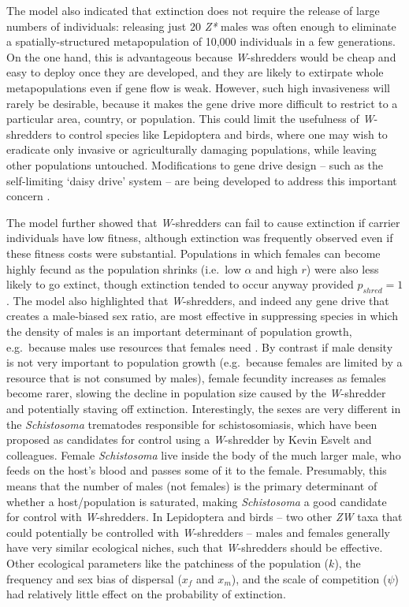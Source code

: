 \documentclass[]{rsos}%
\begin{document}
The model also indicated that extinction does not require the release of
large numbers of individuals: releasing just 20 \emph{Z*} males was
often enough to eliminate a spatially-structured metapopulation of
10,000 individuals in a few generations. On the one hand, this is
advantageous because \emph{W}-shredders would be cheap and easy to
deploy once they are developed, and they are likely to extirpate whole
metapopulations even if gene flow is weak. However, such high
invasiveness will rarely be desirable, because it makes the gene drive
more difficult to restrict to a particular area, country, or population.
This could limit the usefulness of \emph{W}-shredders to control species
like Lepidoptera and birds, where one may wish to eradicate only
invasive or agriculturally damaging populations, while leaving other
populations untouched. Modifications to gene drive design -- such as the
self-limiting `daisy drive' system -- are being developed to address
this important concern \citep{min2017da, noble2019da}.

The model further showed that \emph{W}-shredders can fail to cause
extinction if carrier individuals have low fitness, although extinction
was frequently observed even if these fitness costs were substantial.
Populations in which females can become highly fecund as the population
shrinks (i.e.~low \(\alpha\) and high \(r\)) were also less likely to go
extinct, though extinction tended to occur anyway provided
\(p_{shred} = 1\). The model also highlighted that \emph{W}-shredders,
and indeed any gene drive that creates a male-biased sex ratio, are most
effective in suppressing species in which the density of males is an
important determinant of population growth, e.g.~because males use
resources that females need \citep{li2019int}. By contrast if male
density is not very important to population growth (e.g.~because females
are limited by a resource that is not consumed by males), female
fecundity increases as females become rarer, slowing the decline in
population size caused by the \emph{W}-shredder and potentially staving
off extinction. Interestingly, the sexes are very different in the
\emph{Schistosoma} trematodes responsible for schistosomiasis, which
have been proposed as candidates for control using a \emph{W}-shredder
by Kevin Esvelt and colleagues. Female \emph{Schistosoma} live inside
the body of the much larger male, who feeds on the host's blood and
passes some of it to the female. Presumably, this means that the number
of males (not females) is the primary determinant of whether a
host/population is saturated, making \emph{Schistosoma} a good candidate
for control with \emph{W}-shredders. In Lepidoptera and birds -- two
other \emph{ZW} taxa that could potentially be controlled with
\emph{W}-shredders -- males and females generally have very similar
ecological niches, such that \emph{W}-shredders should be effective.
Other ecological parameters like the patchiness of the population
(\(k\)), the frequency and sex bias of dispersal (\(x_f\) and \(x_m\)),
and the scale of competition (\(\psi\)) had relatively little effect on
the probability of extinction.
\end{document}
